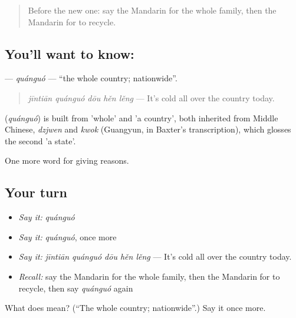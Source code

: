 \label{lesson:ZH-C381-quanguo}



\begin{quote}
Before the new one: say the Mandarin for the whole family, then the Mandarin for to recycle.
\end{quote}

\subsection*{You'll want to know: }
\textbf{} — \emph{quánguó} — \textquotedblleft{}the whole country; nationwide\textquotedblright{}.

\begin{quote}
\textbf{} \emph{jīntiān quánguó dōu hěn lěng} — It's cold all over the country today.
\end{quote}

\begin{cousinweb}
\textbf{} (\emph{quánguó}) is built from  'whole' and  'a country', both inherited from Middle Chinese, \emph{dzjwen} and \emph{kwok} (Guangyun, in Baxter's transcription), which glosses the second 'a state'.
\end{cousinweb}

\begin{grammarlens}[title={What you've built}]
One more word for giving reasons.
\end{grammarlens}

\subsection*{Your turn}
\begin{itemize}
\raggedright
  \item \emph{Say it:} \emph{quánguó}
  \item \emph{Say it:} \emph{quánguó}, once more
  \item \emph{Say it:} \emph{jīntiān quánguó dōu hěn lěng} — It's cold all over the country today.
  \item \emph{Recall:} say the Mandarin for the whole family, then the Mandarin for to recycle, then say \emph{quánguó} again
\end{itemize}

\begin{tcolorbox}[breakable,colback=teal!4,colframe=teal!35!black,title={Before you move on}]
What does  mean? (\textquotedblleft{}The whole country; nationwide\textquotedblright{}.) Say it once more.
\end{tcolorbox}
